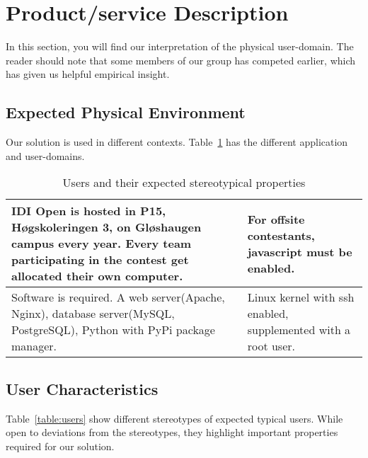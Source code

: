\section{Product/service Description}
In this section, you will find our interpretation of the physical user-domain.
The reader should note that some members of our group has competed earlier,
which has given us helpful empirical insight.

\subsection{Expected Physical Environment}
Our solution is used in different contexts. Table~\ref{table:userChar} has the
different application and user-domains.

\begin{longtable}{|m{3.1712599in}|m{3.1712599in}|}
    \caption{Users and their expected stereotypical properties} \label{table:userChar} \\
\hline
IDI Open is hosted in P15, Høgskoleringen 3, on
Gløshaugen campus every year. Every team participating in the
contest get allocated their own computer. &
For offsite contestants, javascript must be enabled.\\
\hline
Software is required. A web server(Apache, Nginx), database
server(MySQL, PostgreSQL), Python with PyPi package manager.
 &
Linux kernel with ssh enabled, supplemented with a root user.
\\\hline
\end{longtable}

\subsection{User Characteristics}
Table~\ref{table:users} show different stereotypes of expected typical users.
While open to deviations from the stereotypes, they highlight important
properties required for our solution.

